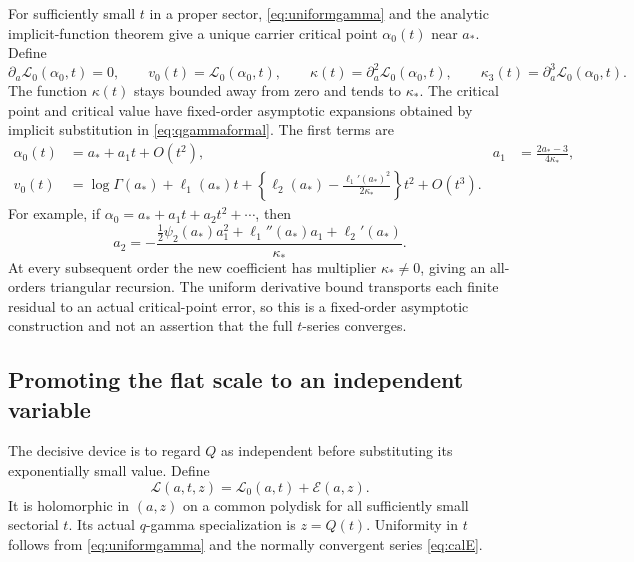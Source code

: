 \documentclass[11pt,a4paper]{article}
\numberwithin{equation}{section}
\theoremstyle{definition}
\theoremstyle{remark}
\newcommand{\cL}{\mathcal L}
\newcommand{\cE}{\mathcal E}
\begin{document}
For sufficiently small $t$ in a proper sector,
\eqref{eq:uniformgamma} and the analytic implicit-function theorem
give a unique carrier critical point $\alpha_0(t)$ near $a_*$.
Define
\begin{equation}
 \partial_a\cL_0(\alpha_0,t)=0,\qquad
 v_0(t)=\cL_0(\alpha_0,t),\qquad
 \kappa(t)=\partial_a^2\cL_0(\alpha_0,t),\qquad
 \kappa_3(t)=\partial_a^3\cL_0(\alpha_0,t).
 \label{eq:carriercritical}
\end{equation}
The function $\kappa(t)$ stays bounded away from zero and tends to
$\kappa_*$. The critical point and critical value have fixed-order
asymptotic expansions obtained by implicit substitution in
\eqref{eq:qgammaformal}. The first terms are
\begin{align}
 \alpha_0(t)&=a_*+a_1t+O(t^2),
 &a_1&=\frac{2a_*-3}{4\kappa_*},\label{eq:alpha0asy}\\
 v_0(t)&=\log\Gamma(a_*)+\ell_1(a_*)t
 +\left\{\ell_2(a_*)-\frac{\ell_1'(a_*)^2}{2\kappa_*}\right\}t^2
 +O(t^3).
 \label{eq:v0asy}
\end{align}
For example, if $\alpha_0=a_*+a_1t+a_2t^2+\cdots$, then
\begin{equation}
 a_2=-\frac{\frac12\psi_2(a_*)a_1^2+
                   \ell_1''(a_*)a_1+\ell_2'(a_*)}{\kappa_*}.
 \label{eq:a2}
\end{equation}
At every subsequent order the new coefficient has multiplier
$\kappa_*\ne0$, giving an all-orders triangular recursion. The
uniform derivative bound transports each finite residual to an
actual critical-point error, so this is a fixed-order asymptotic
construction and not an assertion that the full $t$-series converges.

\subsection{Promoting the flat scale to an independent variable}
The decisive device is to regard $Q$ as independent before substituting
its exponentially small value. Define
\begin{equation}
 \mathscr L(a,t,z)=\cL_0(a,t)+\cE(a,z).
 \label{eq:auxfamily}
\end{equation}
It is holomorphic in $(a,z)$ on a common polydisk for all sufficiently
small sectorial $t$. Its actual $q$-gamma specialization is
$z=Q(t)$. Uniformity in $t$ follows from \eqref{eq:uniformgamma} and
the normally convergent series \eqref{eq:calE}.
\end{document}
